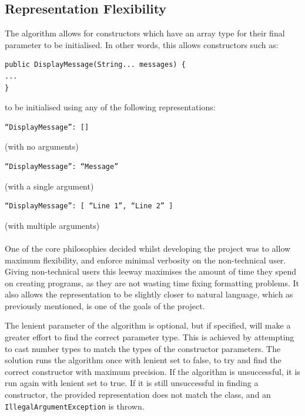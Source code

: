 \subsection{Representation Flexibility}
The algorithm allows for constructors which have an array type for their final parameter to be initialised. In other words, this allows constructors such as:
\begin{verbatim}
public DisplayMessage(String... messages) {
...
}
\end{verbatim}
to be initialised using any of the following representations:
\begin{verbatim}
“DisplayMessage”: []
\end{verbatim}
(with no arguments)
\\
\begin{verbatim}
“DisplayMessage”: “Message”
\end{verbatim}
(with a single argument)
\\
\begin{verbatim}
“DisplayMessage”: [ “Line 1”, “Line 2” ]
\end{verbatim}
(with multiple arguments)
\\\\
One of the core philosophies decided whilst developing the project was to allow maximum flexibility, and enforce minimal verbosity on the non-technical user. Giving non-technical users this leeway maximises the amount of time they spend on creating programs, as they are not wasting time fixing formatting problems. It also allows the representation to be slightly closer to natural language, which as previously mentioned, is one of the goals of the project.\par

The lenient parameter of the algorithm is optional, but if specified, will make a greater effort to find the correct parameter type. This is achieved by attempting to cast number types to match the types of the constructor parameters. The solution runs the algorithm once with lenient set to false, to try and find the correct constructor with maximum precision. If the algorithm is unsuccessful, it is run again with lenient set to true. If it is still unsuccessful in finding a constructor, the provided representation does not match the class, and an \texttt{IllegalArgumentException} is thrown.\par


